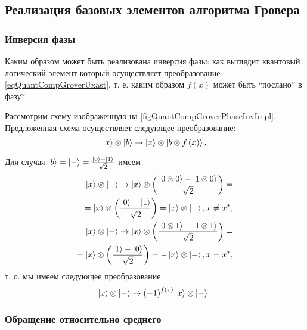 \subsection{ Реализация базовых элементов алгоритма Гровера}

\subsubsection{Инверсия фазы}
Каким образом может быть реализована инверсия фазы: как выглядит
квантовый логический элемент который осуществляет преобразование
\eqref{eqQuantCompGroverUxast}, т. е. каким образом $f\left(x\right)$
может быть ``послано'' в фазу?



Рассмотрим схему изображенную на
\autoref{figQuantCompGroverPhaseInvImpl}. Предложенная схема
осуществляет следующее преобразование:
\begin{equation}
\ket{x}\otimes\ket{b} \rightarrow 
\ket{x}\otimes\left|b\otimes f\left(x\right)\right>.
\nonumber
\end{equation}

Для случая $\ket{b} = \ket{-} = 
\frac{\ket{0} - \ket{1}}{\sqrt{2}}$ имеем
\begin{eqnarray}
\ket{x}\otimes\ket{-} \rightarrow 
\ket{x}\otimes\left(\frac{\left|0\otimes 0\right> -
  \left|1\otimes 0\right>}{\sqrt{2}}\right) = 
\nonumber \\
= \ket{x}\otimes\left(\frac{\ket{0} -
  \ket{1}}{\sqrt{2}}\right) =
\ket{x}\otimes\ket{-}
, x \ne x^{\ast},
\nonumber \\
\ket{x}\otimes\ket{-} \rightarrow 
\ket{x}\otimes\left(\frac{\left|0\otimes 1\right> -
  \left|1\otimes 1\right>}{\sqrt{2}}\right) = 
\nonumber \\
= \ket{x}\otimes\left(\frac{\ket{1} -
  \ket{0}}{\sqrt{2}}\right) =
- \ket{x}\otimes\ket{-}
, x = x^{\ast},
\nonumber
\end{eqnarray}
т. о. мы имеем следующее преобразование
\begin{equation}
\ket{x}\otimes\ket{-} \rightarrow 
\left(-1\right)^{f\left(x\right)}\ket{x}\otimes\ket{-}.
\label{eqQuantCompGroverPhaseInvImpl}
\end{equation}

\subsubsection{Обращение относительно среднего}

